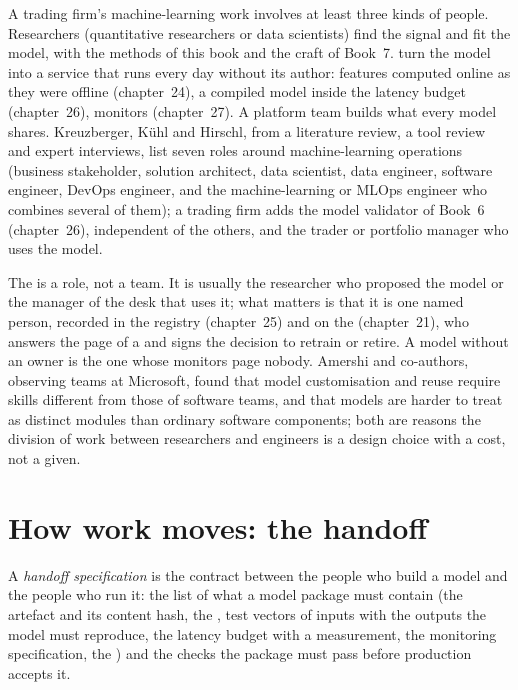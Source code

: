 A trading firm's machine-learning work involves at least three kinds of people. Researchers (quantitative researchers or data
scientists) find the signal and fit the model, with the methods of this book and the craft of Book~7.  turn the model into a service that runs every day without its author: features computed online as they were offline
(chapter~24), a compiled model inside the latency budget (chapter~26), monitors (chapter~27). A platform team builds what every
model shares. Kreuzberger, Kühl and Hirschl, from a literature review, a tool review and expert interviews, list seven roles
around machine-learning operations (business stakeholder, solution architect, data scientist, data engineer, software engineer,
DevOps engineer, and the machine-learning or MLOps engineer who combines several of them); a trading firm adds the model
validator of Book~6 (chapter~26), independent of the others, and the trader or portfolio manager who uses the model.

The  is a role, not a team. It is usually the researcher who proposed the model or the manager of the desk that uses
it; what matters is that it is one named person, recorded in the registry (chapter~25) and on the  (chapter~21), who
answers the page of a  and signs the decision to retrain or retire. A model without an owner is the one whose
monitors page nobody. Amershi and co-authors, observing teams at Microsoft, found that model customisation and reuse require
skills different from those of software teams, and that models are harder to treat as distinct modules than ordinary software
components; both are reasons the division of work between researchers and engineers is a design choice with a cost, not a given.

\section{How work moves: the handoff}

\begin{definition}\label{def:ml:the-machine-learning-team:handoff}
A \emph{handoff specification} is the contract between the people who build a model and the people
who run it: the list of what a model package must contain (the artefact and its content hash, the , test
vectors of inputs with the outputs the model must reproduce, the latency budget with a measurement, the monitoring specification,
the ) and the checks the package must pass before production accepts it.
\end{definition}


